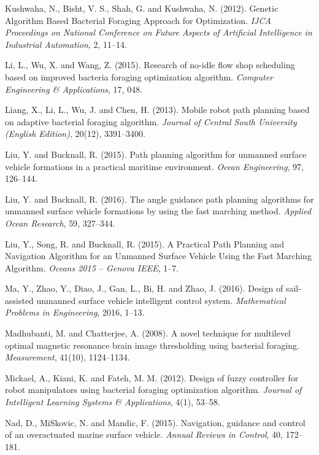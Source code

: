 \documentclass{PDS}%
\theoremstyle{definition}
\begin{document}
\begin{Backmatter}
\begin{thebibliography}{}
{Kushwaha, N., Bisht, V. S., Shah, G. and Kushwaha, N.} (2012).
Genetic Algorithm Based Bacterial Foraging Approach for Optimization.
\textit{IJCA Proceedings on National Conference on Future Aspects of Artificial Intelligence in Industrial Automation}, {2}, 11--14.

{Li, L., Wu, X. and Wang, Z.} (2015).
Research of no-idle flow shop scheduling based on improved bacteria foraging optimization algorithm.
\textit{Computer Engineering \& Applications}, 17, 048.

{Liang, X., Li, L., Wu, J. and Chen, H.} (2013).
Mobile robot path planning based on adaptive bacterial foraging algorithm.
\textit{Journal of Central South University (English Edition)}, {20}(12), 3391--3400.

{Liu, Y. and Bucknall, R.} ({2015}). Path planning algorithm for unmanned surface vehicle formations in a practical maritime environment.
\textit{Ocean Engineering}, {97}, 126--144.

{Liu, Y. and Bucknall, R.} (2016).
The angle guidance path planning algorithms for unmanned surface vehicle formations by using the fast marching method.
\textit{Applied Ocean Research}, {59}, 327--344.

{Liu, Y., Song, R. and Bucknall, R.} ({2015}). A Practical Path Planning and Navigation Algorithm for an Unmanned Surface Vehicle Using the Fast Marching Algorithm.
\textit{Oceans 2015 -- Genova IEEE}, 1--7.


{Ma, Y., Zhao, Y., Diao, J., Gan, L., Bi, H. and Zhao, J.} ({2016}).
Design of sail-assisted unmanned surface vehicle intelligent control system. \textit{Mathematical Problems in Engineering},
2016, 1--13.

{Madhubanti, M. and Chatterjee, A.} ({2008}).
A novel technique for multilevel optimal magnetic resonance brain image thresholding using bacterial foraging.
\textit{Measurement}, {41}(10), 1124--1134.

{Mickael, A., Kiani, K. and Fateh, M. M.} ({2012}). Design of fuzzy controller for robot manipulators using bacterial foraging optimization algorithm.
\textit{Journal of Intelligent Learning Systems \& Applications}, {4}(1),
53--58.

{Nad, D., MiSkovic, N. and Mandic, F.} ({2015}). Navigation, guidance and control of an overactuated marine surface vehicle.
\textit{Annual Reviews in Control}, {40}, 172--181.


\end{thebibliography}
\end{Backmatter}
\end{document}
